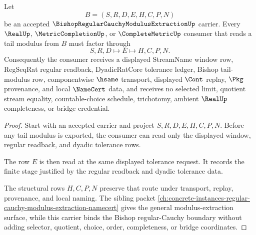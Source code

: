 \begin{theorem}
\label{thm:bishop-regular-cauchy-modulus-extraction-tail-modulus}
Let
$$
B=(S,R,D,E,H,C,P,N)
$$
be an accepted $\BishopRegularCauchyModulusExtractionUp$ carrier. Every $\RealUp$, $\MetricCompletionUp$, or $\CompleteMetricUp$ consumer that reads a tail modulus from $B$ must factor through
$$
S,R,D \longmapsto E \longmapsto H,C,P,N .
$$
Consequently the consumer receives a displayed StreamName window row, RegSeqRat regular readback, DyadicRatCore tolerance ledger, Bishop tail-modulus row, componentwise $\hsame$ transport, displayed $\Cont$ replay, $\Pkg$ provenance, and local $\NameCert$ data, and receives no selected limit, quotient stream equality, countable-choice schedule, trichotomy, ambient $\RealUp$ completeness, or bridge credential.
\end{theorem}
\begin{proof}
Start with an accepted carrier and project $S,R,D,E,H,C,P,N$. Before any tail modulus is exported, the consumer can read only the displayed window, regular readback, and dyadic tolerance rows.

The row $E$ is then read at the same displayed tolerance request. It records the finite stage justified by the regular readback and dyadic tolerance data.

The structural rows $H,C,P,N$ preserve that route under transport, replay, provenance, and local naming. The sibling packet \autoref{ch:concrete-instances-regular-cauchy-modulus-extraction-namecert} gives the general modulus-extraction surface, while this carrier binds the Bishop regular-Cauchy boundary without adding selector, quotient, choice, order, completeness, or bridge coordinates.
\end{proof}


\begin{closurestatus}{\BishopRegularCauchyModulusExtractionUp}
  \theoryclosure{\seedClosure}
  \formalstatus{\unformalizedV}
\end{closurestatus}
